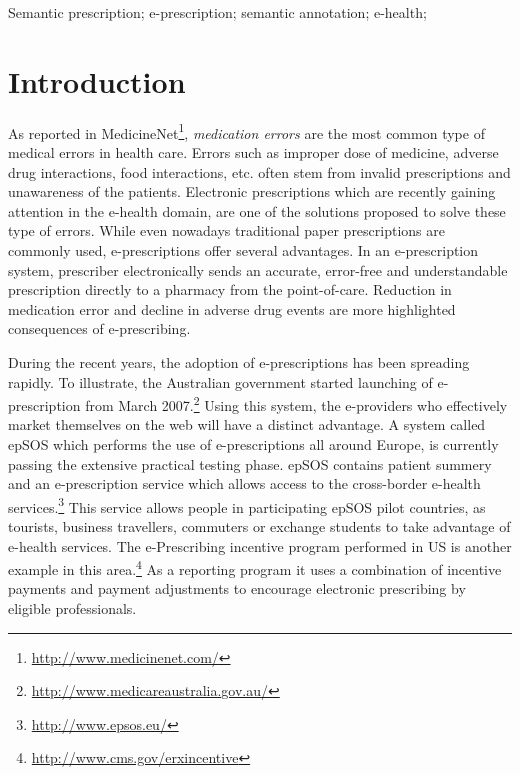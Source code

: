 \documentclass[10pt, conference, compsocconf]{IEEEtran}
\begin{document}
\begin{IEEEkeywords}
 Semantic prescription; e-prescription; semantic annotation; e-health;

\end{IEEEkeywords}


\IEEEpeerreviewmaketitle



\section{Introduction}
\label{intro}

As reported in MedicineNet\footnote{\url{http://www.medicinenet.com/}}, \emph{medication errors} are the most common type of medical errors in health care.
Errors such as improper dose of medicine, adverse drug interactions, food interactions, etc. often stem from invalid prescriptions and unawareness of the patients.
Electronic prescriptions which are recently gaining attention in the e-health domain, are one of the solutions proposed to solve these type of errors.
While even nowadays traditional paper prescriptions are commonly used, e-prescriptions offer several advantages.
In an e-prescription system, prescriber electronically sends an accurate, error-free and understandable prescription directly to a pharmacy from the point-of-care.
Reduction in medication error and decline in adverse drug events are more highlighted consequences of e-prescribing.

During the recent years, the adoption of e-prescriptions has been spreading rapidly.
To illustrate, the Australian government started launching of e-prescription from March 2007.\footnote{\url{http://www.medicareaustralia.gov.au/}}
Using this system, the e-providers who effectively market themselves on the web will have a distinct advantage\cite{Ravichandran}.
A system called epSOS which performs the use of e-prescriptions all around Europe, is currently passing the extensive practical testing phase.
epSOS contains patient summery and an e-prescription service which allows access to the cross-border e-health services.\footnote{\url{http://www.epsos.eu/}}
This service allows people in participating epSOS pilot countries, as tourists, business travellers, commuters or exchange students to take advantage of e-health services.
The e-Prescribing incentive program performed in US is another example in this area.\footnote{\url{http://www.cms.gov/erxincentive}}
As a reporting program it uses a combination of incentive payments and payment adjustments to encourage electronic prescribing by eligible professionals.
\end{document}
